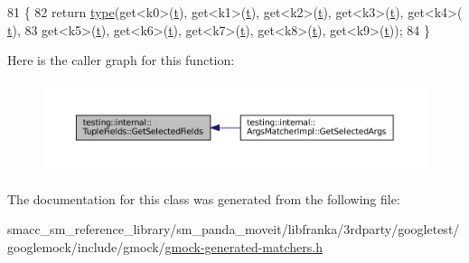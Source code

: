 \begin{DoxyCode}
81                                                 \{
82     \textcolor{keywordflow}{return} \hyperlink{classtesting_1_1internal_1_1TupleFields_a5480877377ebc94bf3a6c6cab5c369bc}{type}(get<k0>(\hyperlink{namespacebattery__monitor__node_a7a63d20d1ea461e280f4eb5b47f925cd}{t}), get<k1>(\hyperlink{namespacebattery__monitor__node_a7a63d20d1ea461e280f4eb5b47f925cd}{t}), get<k2>(\hyperlink{namespacebattery__monitor__node_a7a63d20d1ea461e280f4eb5b47f925cd}{t}), get<k3>(\hyperlink{namespacebattery__monitor__node_a7a63d20d1ea461e280f4eb5b47f925cd}{t}), get<k4>(
      \hyperlink{namespacebattery__monitor__node_a7a63d20d1ea461e280f4eb5b47f925cd}{t}),
83         get<k5>(\hyperlink{namespacebattery__monitor__node_a7a63d20d1ea461e280f4eb5b47f925cd}{t}), get<k6>(\hyperlink{namespacebattery__monitor__node_a7a63d20d1ea461e280f4eb5b47f925cd}{t}), get<k7>(\hyperlink{namespacebattery__monitor__node_a7a63d20d1ea461e280f4eb5b47f925cd}{t}), get<k8>(\hyperlink{namespacebattery__monitor__node_a7a63d20d1ea461e280f4eb5b47f925cd}{t}), get<k9>(\hyperlink{namespacebattery__monitor__node_a7a63d20d1ea461e280f4eb5b47f925cd}{t}));
84   \}
\end{DoxyCode}
Here is the caller graph for this function\+:
\nopagebreak
\begin{figure}[H]
\begin{center}
\leavevmode
\includegraphics[width=350pt]{classtesting_1_1internal_1_1TupleFields_a020eefb4630e6dffe8bcadd0a70b1bab_icgraph}
\end{center}
\end{figure}


The documentation for this class was generated from the following file\+:\begin{DoxyCompactItemize}
\item 
smacc\+\_\+sm\+\_\+reference\+\_\+library/sm\+\_\+panda\+\_\+moveit/libfranka/3rdparty/googletest/googlemock/include/gmock/\hyperlink{gmock-generated-matchers_8h}{gmock-\/generated-\/matchers.\+h}\end{DoxyCompactItemize}
